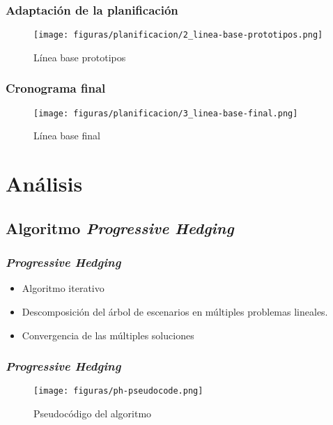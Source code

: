\documentclass{beamer}
\begin{document}
\begin{frame}[plain]
    \frametitle{Adaptación de la planificación}
    \begin{figure}[H]
        \centerline{\texttt{[image: figuras/planificacion/2\_linea-base-prototipos.png]}}
        \caption{Línea base prototipos}
    \end{figure}
\end{frame}

\begin{frame}[plain]
    \frametitle{Cronograma final}
    \begin{figure}[H]
        \centerline{\texttt{[image: figuras/planificacion/3\_linea-base-final.png]}}
        \caption{Línea base final}
    \end{figure}
\end{frame}

\section{Análisis}

\subsection{Algoritmo \textit{Progressive Hedging}}

\begin{frame}
    \frametitle{\textit{Progressive Hedging}}
    \begin{itemize}
        \item Algoritmo iterativo
        \item Descomposición del árbol de escenarios en múltiples problemas lineales.
        \item Convergencia de las múltiples soluciones
    \end{itemize}
\end{frame}

\begin{frame}[plain]
    \frametitle{\textit{Progressive Hedging}}
    \begin{figure}[H]
        \centerline{\texttt{[image: figuras/ph-pseudocode.png]}}
        \caption{Pseudocódigo del algoritmo}
    \end{figure}
\end{frame}
\end{document}
